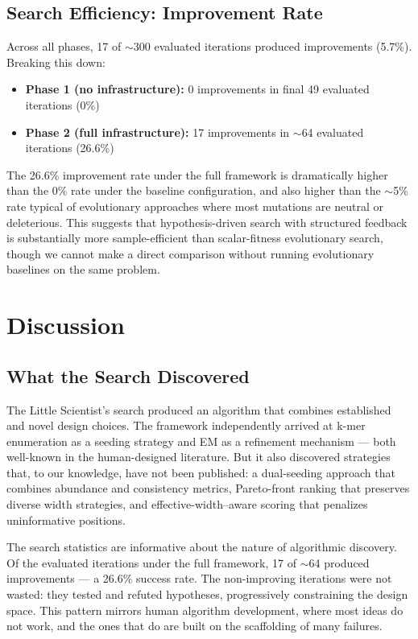 \documentclass[11pt,a4paper]{article}
\begin{document}
\subsection{Search Efficiency: Improvement Rate}

Across all phases, 17 of $\sim$300 evaluated iterations produced improvements (5.7\%). Breaking this down:

\begin{itemize}
    \item \textbf{Phase 1 (no infrastructure):} 0 improvements in final 49 evaluated iterations (0\%)
    \item \textbf{Phase 2 (full infrastructure):} 17 improvements in $\sim$64 evaluated iterations (26.6\%)
\end{itemize}

The 26.6\% improvement rate under the full framework is dramatically higher than the 0\% rate under the baseline configuration, and also higher than the $\sim$5\% rate typical of evolutionary approaches where most mutations are neutral or deleterious. This suggests that hypothesis-driven search with structured feedback is substantially more sample-efficient than scalar-fitness evolutionary search, though we cannot make a direct comparison without running evolutionary baselines on the same problem.

\section{Discussion}
\label{sec:discussion}

\subsection{What the Search Discovered}

The Little Scientist's search produced an algorithm that combines established and novel design choices. The framework independently arrived at k-mer enumeration as a seeding strategy and EM as a refinement mechanism --- both well-known in the human-designed literature. But it also discovered strategies that, to our knowledge, have not been published: a dual-seeding approach that combines abundance and consistency metrics, Pareto-front ranking that preserves diverse width strategies, and effective-width--aware scoring that penalizes uninformative positions.

The search statistics are informative about the nature of algorithmic discovery. Of the evaluated iterations under the full framework, 17 of $\sim$64 produced improvements --- a 26.6\% success rate. The non-improving iterations were not wasted: they tested and refuted hypotheses, progressively constraining the design space. This pattern mirrors human algorithm development, where most ideas do not work, and the ones that do are built on the scaffolding of many failures.
\end{document}
